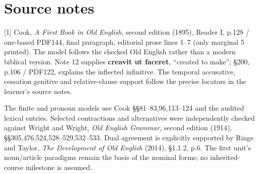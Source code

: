 \par\begin{minipage}{\linewidth}\raggedright

\end{minipage}\par\addvspace{4pt}

\clearpage
\section*{Source notes}

\begingroup\fontsize{10}{12.8}\selectfont
[1] Cook, \emph{A First Book in Old English}, second edition (1895), Reader I, p.128 /\allowbreak{} one-based PDF144, final paragraph, editorial prose lines 1–7 (only marginal 5 printed). The model follows the checked Old English rather than a modern biblical version. Note 12 supplies \textbf{creavit ut faceret}, “created to make”; §200, p.106 /\allowbreak{} PDF122, explains the inflected infinitive. The temporal accusative, cessation genitive and relative-clause support follow the precise locators in the learner’s source notes.

The finite and pronoun models use Cook §§81–83,96,113–124 and the audited lexical entries. Selected contractions and alternatives were independently checked against Wright and Wright, \emph{Old English Grammar}, second edition (1914), §§305,476,524,528–529,532–533. Dual agreement is explicitly supported by Ringe and Taylor, \emph{The Development of Old English} (2014), §1.1.2, p.6. The first unit’s noun/\allowbreak{}article paradigms remain the basis of the nominal forms; no inherited-course milestone is assumed.

\endgroup

\par\label{end-ch02-key}
\clearpage\endgroup
